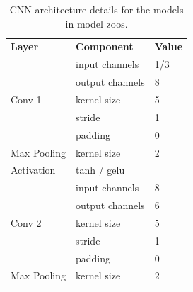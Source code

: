 \begin{table}[ht!]
    \begin{minipage}{0.4\textwidth}
    \centering
    {\small
    \caption{CNN architecture details for the models in model zoos. }
    \begin{tabularx}{\linewidth}{lll}
        \toprule
        \textbf{Layer}          & \textbf{Component} & \textbf{Value} \\
        \cmidrule(r){1-1} \cmidrule(rl){2-2}  \cmidrule(rl){3-3}%
        \multirow{5}{*}{Conv 1} & input channels     & 1/3                 \\
                                & output channels    & 8                    \\
                                & kernel size        & 5                    \\
                                & stride             & 1                    \\
                                & padding            & 0                    \\
        \cmidrule(r){1-1} \cmidrule(rl){2-2}  \cmidrule(rl){3-3}%
        Max Pooling             & kernel size        & 2                    \\
        \cmidrule(r){1-1} \cmidrule(rl){2-2}  \cmidrule(rl){3-3}%
        Activation              & tanh / gelu         &                      \\
        \cmidrule(r){1-1} \cmidrule(rl){2-2}  \cmidrule(rl){3-3}%
        \multirow{5}{*}{Conv 2} & input channels     & 8                    \\
                                & output channels    & 6                    \\
                                & kernel size        & 5                    \\
                                & stride             & 1                    \\
                                & padding            & 0                    \\
        \cmidrule(r){1-1} \cmidrule(rl){2-2}  \cmidrule(rl){3-3}%
        Max Pooling             & kernel size        & 2                    \\

\end{tabularx}}
\end{minipage}
\end{table}
